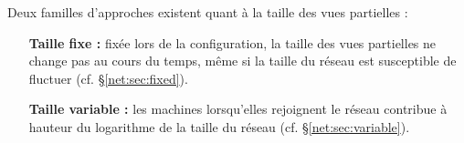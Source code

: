 Deux familles d'approches existent quant à la taille des vues partielles :
\begin{itemize}
\item [\textbf{Taille fixe :}] fixée lors de la configuration, la taille des
  vues partielles ne change pas au cours du temps, même si la taille du réseau
  est susceptible de fluctuer (cf. §\ref{net:sec:fixed}).
\item [\textbf{Taille variable :}] les machines lorsqu'elles rejoignent le
  réseau contribue à hauteur du logarithme de la taille du réseau
  (cf. §\ref{net:sec:variable}).
\end{itemize}

